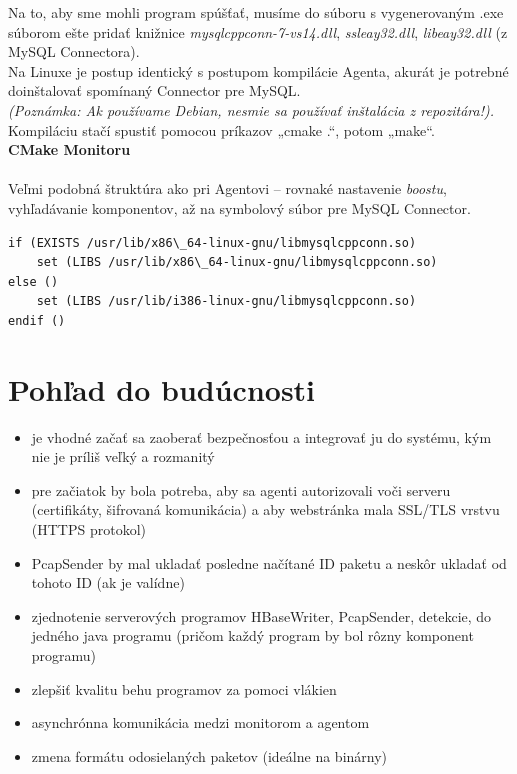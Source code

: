 \documentclass[a4paper,12pt]{article}
\begin{document}
Na to, aby sme mohli program spúšťať, musíme do súboru s vygenerovaným .exe súborom ešte pridať knižnice \textit{mysqlcppconn-7-vs14.dll}, \textit{ssleay32.dll}, \textit{libeay32.dll} (z MySQL Connectora). \\

Na Linuxe je postup identický s postupom kompilácie Agenta, akurát je potrebné doinštalovať spomínaný Connector pre MySQL. \\
\textit{(Poznámka: Ak používame Debian, nesmie sa používať inštalácia z repozitára!).} \\
Kompiláciu stačí spustiť pomocou príkazov „cmake .“, potom „make“. \\ 

\textbf{CMake Monitoru} \\ \\
Veľmi podobná štruktúra ako pri Agentovi – rovnaké nastavenie \textit{boostu}, vyhľadávanie komponentov, až na symbolový súbor pre MySQL Connector.\\

\begin{lstlisting}
if (EXISTS /usr/lib/x86\_64-linux-gnu/libmysqlcppconn.so) 
	set (LIBS /usr/lib/x86\_64-linux-gnu/libmysqlcppconn.so) 
else () 
	set (LIBS /usr/lib/i386-linux-gnu/libmysqlcppconn.so) 
endif ()

\end{lstlisting}
\newpage

\section{Pohľad do budúcnosti}
\begin{itemize} 
	\item je vhodné začať sa zaoberať bezpečnosťou a integrovať ju do systému, kým nie je príliš veľký a rozmanitý
	\item pre začiatok by bola potreba, aby sa agenti autorizovali voči serveru (certifikáty, šifrovaná komunikácia) a aby webstránka mala SSL/TLS vrstvu (HTTPS protokol)
	\item PcapSender by mal ukladať posledne načítané ID paketu a neskôr ukladať od tohoto ID (ak je valídne) 
	\item zjednotenie serverových programov HBaseWriter, PcapSender, detekcie, do jedného java programu (pričom každý program by bol rôzny komponent programu)
	\item zlepšiť kvalitu behu programov za pomoci vlákien
	\item asynchrónna komunikácia medzi monitorom a agentom
	\item zmena formátu odosielaných paketov (ideálne na binárny) \\
\end{itemize}
\newpage
\end{document}
